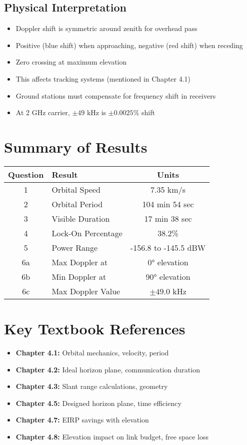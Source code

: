 \documentclass[11pt,letterpaper]{article}
\begin{document}
\subsection{Physical Interpretation}
\begin{itemize}
    \item Doppler shift is symmetric around zenith for overhead pass
    \item Positive (blue shift) when approaching, negative (red shift) when receding
    \item Zero crossing at maximum elevation
    \item This affects tracking systems (mentioned in Chapter 4.1)
    \item Ground stations must compensate for frequency shift in receivers
    \item At 2 GHz carrier, $\pm 49$ kHz is $\pm 0.0025\%$ shift
\end{itemize}

\section{Summary of Results}

\begin{center}
\begin{tabular}{@{}clc@{}}
\toprule
\textbf{Question} & \textbf{Result} & \textbf{Units} \\
\midrule
1 & Orbital Speed & 7.35 km/s \\
2 & Orbital Period & 104 min 54 sec \\
3 & Visible Duration & 17 min 38 sec \\
4 & Lock-On Percentage & 38.2\% \\
5 & Power Range & -156.8 to -145.5 dBW \\
6a & Max Doppler at & 0° elevation \\
6b & Min Doppler at & 90° elevation \\
6c & Max Doppler Value & $\pm 49.0$ kHz \\
\bottomrule
\end{tabular}
\end{center}

\section{Key Textbook References}

\begin{itemize}
    \item \textbf{Chapter 4.1:} Orbital mechanics, velocity, period
    \item \textbf{Chapter 4.2:} Ideal horizon plane, communication duration
    \item \textbf{Chapter 4.3:} Slant range calculations, geometry
    \item \textbf{Chapter 4.5:} Designed horizon plane, time efficiency
    \item \textbf{Chapter 4.7:} EIRP savings with elevation
    \item \textbf{Chapter 4.8:} Elevation impact on link budget, free space loss
\end{itemize}
\end{document}
